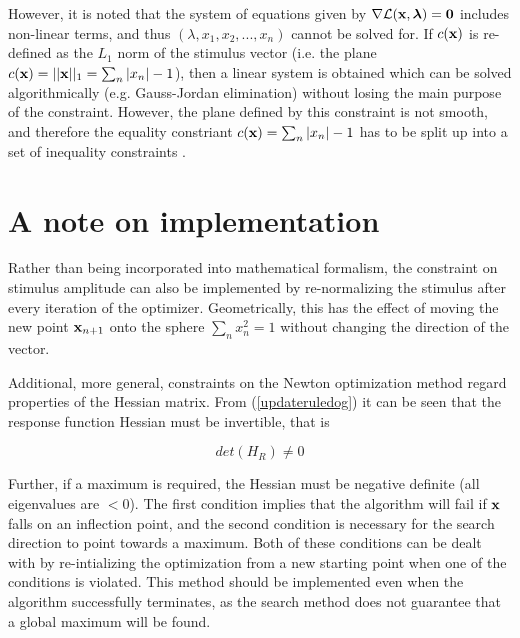 \documentclass{article}
\newcommand{\Lagr}{\mathcal{L}}
\newcommand{\vect}[1]{\textbf{\textrm{#1}}}
\begin{document}
However, it is noted that the system of equations given by $\nabla \Lagr(\vect{x},\bm{\lambda}) = \vect{0}$ includes non-linear terms, and thus $(\lambda, x_1, x_2, ... , x_n)$ cannot be solved for.
If $c(\vect{x})$ is re-defined as the $L_1$ norm of the stimulus vector (i.e. the plane $c(\vect{x}) = ||\vect{x}||_1 = \sum_n{|x_n|} - 1$), then a linear system is obtained which can be solved algorithmically (e.g. Gauss-Jordan elimination) without losing the main purpose of the constraint.
However, the plane defined by this constraint is not smooth, and therefore the equality constriant $c(\vect{x}) = \sum_n{|x_n|} - 1$ has to be split up into a set of inequality constraints \citep[ch.12, p. 306]{nocedal2006}. 


\section{A note on implementation}
Rather than being incorporated into mathematical formalism, the constraint on stimulus amplitude can also be implemented by re-normalizing the stimulus after every iteration of the optimizer. Geometrically, this has the effect of moving the new point $\vect{x}_{n+1}$ onto the sphere $\sum_n{x_n^2} = 1$ without changing the direction of the vector. \par
\hfill \newline
Additional, more general, constraints on the Newton optimization method regard properties of the Hessian matrix.
From (\ref{updateruledog}) it can be seen that the response function Hessian must be invertible, that is

\begin{equation}
	det(H_R) \neq 0
\end{equation}

Further, if a maximum is required, the Hessian must be negative definite (all eigenvalues are $< 0$).
The first condition implies that the algorithm will fail if $\vect{x}$ falls on an inflection point, and the second condition is necessary for the search direction to point towards a maximum. 
Both of these conditions can be dealt with by re-intializing the optimization from a new starting point when one of the conditions is violated.
This method should be implemented even when the algorithm successfully terminates, as the search method does not guarantee that a global maximum will be found. 
\end{document}

